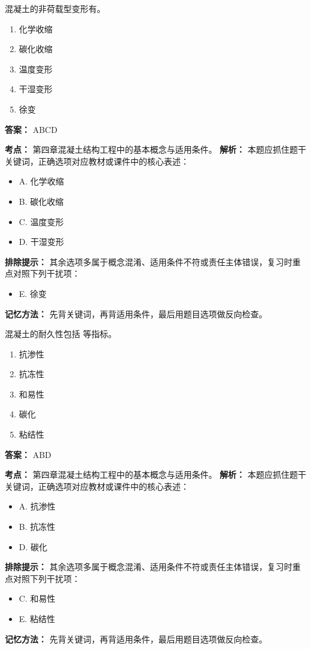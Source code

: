 \documentclass[UTF8,fontset=fandol,11pt]{ctexart}
\begin{document}
\begin{quizbox}[title={第 63 题}]
混凝土的非荷载型变形有。\\
\begin{enumerate}[label=\Alph*.]
\item 化学收缩
\item 碳化收缩
\item 温度变形
\item 干湿变形
\item 徐变
\end{enumerate}
\textbf{答案：} ABCD
\vspace{0.25em}
\begin{answerbox}[title={考点解析}]
\textbf{考点：} 第四章混凝土结构工程中的基本概念与适用条件。
\textbf{解析：} 本题应抓住题干关键词，正确选项对应教材或课件中的核心表述：
\begin{itemize}
\item A. 化学收缩
\item B. 碳化收缩
\item C. 温度变形
\item D. 干湿变形
\end{itemize}
\textbf{排除提示：} 其余选项多属于概念混淆、适用条件不符或责任主体错误，复习时重点对照下列干扰项：
\begin{itemize}
\item E. 徐变
\end{itemize}
\textbf{记忆方法：} 先背关键词，再背适用条件，最后用题目选项做反向检查。
\end{answerbox}
\end{quizbox}

\begin{quizbox}[title={第 64 题}]
混凝土的耐久性包括 等指标。\\
\begin{enumerate}[label=\Alph*.]
\item 抗渗性
\item 抗冻性
\item 和易性
\item 碳化
\item 粘结性
\end{enumerate}
\textbf{答案：} ABD
\vspace{0.25em}
\begin{answerbox}[title={考点解析}]
\textbf{考点：} 第四章混凝土结构工程中的基本概念与适用条件。
\textbf{解析：} 本题应抓住题干关键词，正确选项对应教材或课件中的核心表述：
\begin{itemize}
\item A. 抗渗性
\item B. 抗冻性
\item D. 碳化
\end{itemize}
\textbf{排除提示：} 其余选项多属于概念混淆、适用条件不符或责任主体错误，复习时重点对照下列干扰项：
\begin{itemize}
\item C. 和易性
\item E. 粘结性
\end{itemize}
\textbf{记忆方法：} 先背关键词，再背适用条件，最后用题目选项做反向检查。
\end{answerbox}
\end{quizbox}
\end{document}
